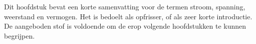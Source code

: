 Dit hoofdstuk bevat een korte samenvatting voor de termen stroom, spanning, weerstand en vermogen. Het is bedoelt als opfrisser, of als zeer korte introductie. De aangeboden stof is voldoende om de erop volgende hoofdstukken te kunnen begrijpen.

